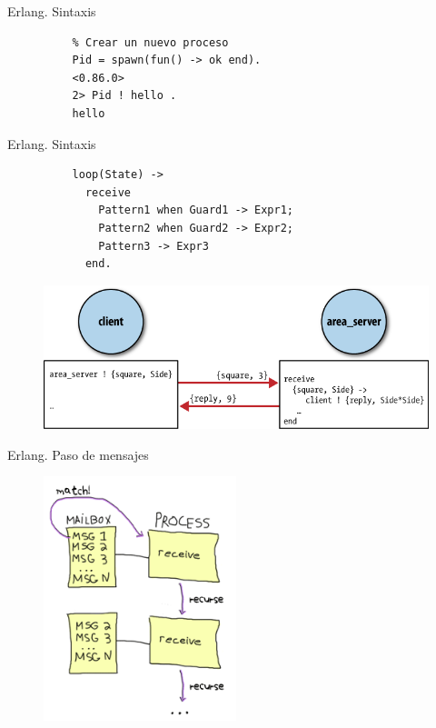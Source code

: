 \documentclass{beamer}
\begin{document}
      \begin{frame}[fragile]{Erlang. Sintaxis}
        \begin{verbatim}
          % Crear un nuevo proceso
          Pid = spawn(fun() -> ok end).
          <0.86.0>
          2> Pid ! hello .
          hello
        \end{verbatim}
      \end{frame}

      \begin{frame}[fragile]{Erlang. Sintaxis}
        \begin{verbatim}
          loop(State) ->
            receive
              Pattern1 when Guard1 -> Expr1;
              Pattern2 when Guard2 -> Expr2;
              Pattern3 -> Expr3
            end.
        \end{verbatim}
      \end{frame}

      \begin{frame}
        \begin{figure}
          \includegraphics{actor-modelling.png}
        \end{figure}
      \end{frame}

      \begin{frame}{Erlang. Paso de mensajes}
        \begin{figure}
          \includegraphics[width=0.5\textwidth]{msg-match.png}
        \end{figure}
      \end{frame}
\end{document}

